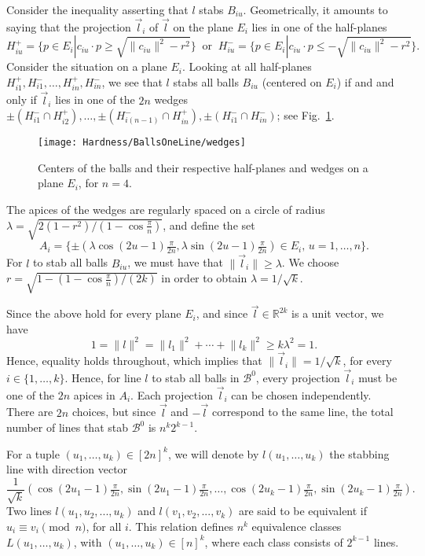 \documentclass[12pt]{article}
\newcommand{\R}{\mathbb{R}}
\begin{document}
Consider the inequality asserting that $l$ stabs $B_{iu}$.
Geometrically, it amounts to saying that
the projection $\vec{l}_i$ of $\vec{l}$ on the plane $E_i$ lies in one of the half-planes
\begin{equation*}
H_{iu}^+=\{p\in E_i | c_{iu}\cdot p \geq \sqrt{\lVert c_{iu}\rVert^2-r^2}\} 
\;\;\mathrm{or}\;\; 
H_{iu}^-=\{p\in E_i | c_{iu}\cdot p \leq -\sqrt{\lVert c_{iu}\rVert^2-r^2}\}.
\end{equation*}
Consider the situation on a plane $E_i$.
Looking at all half-planes $H_{i1}^+, H_{i1}^-,\ldots,H_{in}^+, H_{in}^-$, we see that 
$l$ stabs all balls $B_{iu}$ (centered on $E_i$) if and and only if $\vec{l}_i$ lies in one of the $2n$ wedges
$\pm (H_{i1}^- \cap H_{i2}^+),\ldots, \pm (H_{i(n-1)}^- \cap H_{in}^+), \pm (H_{i1}^- \cap H_{in}^-)$; 
see Fig.~\ref{wedges}. 
\begin{figure}
  \centering
	 \texttt{[image: Hardness/BallsOneLine/wedges]}
	 \caption{Centers of the balls and their respective half-planes and wedges on a plane $E_i$, for $n=4$.}
	 \label{wedges}
\end{figure}
The apices of the wedges are regularly spaced on a circle of radius 
$\lambda=\sqrt{2(1-r^2)/(1-\cos\frac{\pi}{n})}$, 
and define the set 
\begin{equation*}
A_i=\{\pm \left(\lambda \cos(2u-1)\tfrac{\pi}{2n}, \lambda \sin(2u-1)\tfrac{\pi}{2n}\right)\in E_i,\, u=1,\ldots,n\}.
\end{equation*}
For $l$ to stab all balls $B_{iu}$, we must have that $\lVert \vec{l}_i\rVert\geq\lambda$.
We choose $r=\sqrt{1-(1-\cos\frac{\pi}{n})/(2k)}$ in order to obtain $\lambda=1/\sqrt{k}$.  

Since the above hold for every plane $E_i$, and since $\vec{l}\in\R^{2k}$ is a unit vector, 
we have
$$
1=\lVert l\rVert^2=\lVert l_1\rVert^2 +\cdots +\lVert l_k\rVert^2 \geq k\lambda^2 = 1.
$$
 Hence, equality holds throughout, which implies that $\lVert\vec{l}_i\rVert=1/\sqrt{k}$, for every $i\in\{1,\ldots,k\}$. Hence, for 
line $l$ to stab all balls in $\mathcal{B}^0$, every projection $\vec{l}_i$ must be one 
of the $2n$ apices in $A_i$.  Each projection $\vec{l}_i$ can be chosen independently. There are $2n$ choices, but since $\vec{l}$ and 
$-\vec{l}$ correspond to the same line, the total number of lines that stab $\mathcal{B}^0$ is $n^k 2^{k-1}$. 

For a tuple $(u_1,\ldots,u_k)\in[2n]^k$, we will denote by $l(u_1,\ldots, u_k)$ the stabbing line with direction vector
\begin{equation*}
\frac{1}{\sqrt{k}}\left(\cos(2u_1-1)\tfrac{\pi}{2n}, \sin(2u_1-1)\tfrac{\pi}{2n}, \ldots, 
\cos(2u_k-1)\tfrac{\pi}{2n}, \sin(2u_k-1)\tfrac{\pi}{2n}\right).
\end{equation*}
Two lines $l(u_1,u_2,...,u_k)$
and $l(v_1,v_2,...,v_k)$ are said to be equivalent
if $u_i \equiv v_i\pmod n$, for all $i$. 
This relation defines $n^k$ equivalence classes $L(u_1,\ldots,u_k)$, with $(u_1,\ldots,u_k)\in[n]^k$, 
where each class consists of $2^{k-1}$ lines. 
\end{document}

